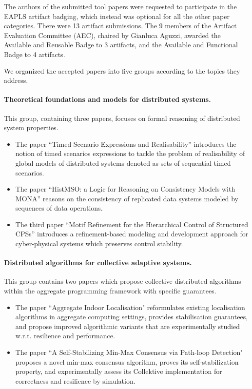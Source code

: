 \documentclass[]{llncs}
\begin{document}
The authors of the submitted tool papers were requested to participate in the EAPLS
artifact badging, which instead was optional for all the other paper categories. There
were 13 artifact submissions. The 9 members of the Artifact Evaluation Committee
(AEC), chaired by Gianluca Aguzzi, awarded the Available and Reusable Badge to 3
artifacts, and the Available and Functional Badge to 4 artifacts.


We organized the accepted papers into five groups according to the topics they address.

\paragraph{Theoretical foundations and models for distributed systems.} 
This group, containing three papers, focuses on formal reasoning of distributed system properties. 
\begin{itemize}
\item The paper ``Timed Scenario Expressions and Realisability''  %
  introduces the notion of timed scenarios expressions to tackle the problem of realisability of global models of distributed systems denoted as sets of sequential timed scenarios.
\item The paper ``HistMSO: a Logic for Reasoning on Consistency Models with MONA'' reasons on the consistency of replicated data systems modeled by sequences of data operations. 
\item The third paper ``Motif Refinement for the Hierarchical Control of Structured CPSs'' introduces a refinement-based modeling and development approach for cyber-physical systems which preserves control stability.  
\end{itemize}

\paragraph{Distributed algorithms for collective adaptive systems.} 
This group contains two papers which propose collective distributed algorithms within the aggregate programming framework with specific guarantees. 
\begin{itemize}
\item The paper ``Aggregate Indoor Localisation" reformulates existing localisation algorithms in aggregate computing settings, provides stabilisation guarantees, and propose improved algorithmic variants %
   that are experimentally studied w.r.t. resilience and performance.
\item The paper ``A Self-Stabilizing Min-Max Consensus via Path-loop Detection" proposes a novel min-max consensus algorithm, proves its self-stabilization property, and experimentally assess its Collektive implementation for correctness and resilience by simulation. 
\end{itemize}
\end{document}
